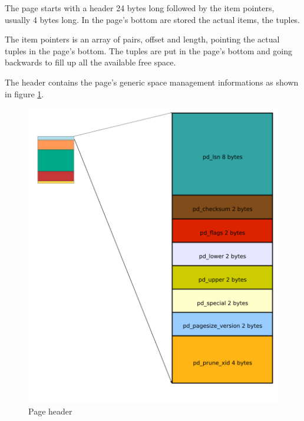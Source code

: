 The page starts with a header 24 bytes long followed 
by 
the item pointers, usually 4 bytes long. In the page's bottom are stored the 
actual items, the tuples.\newline

The item pointers is an array of pairs, offset and 
length, pointing the actual tuples in the page's bottom. The tuples are put in 
the page's bottom and going backwards to fill up all the available free 
space.\newline 

The header contains the page's generic space management informations as shown 
in figure \ref{fig:HEADERPAG01}. 


\begin{figure}[H]
\begin{center}

\includegraphics[scale=0.55]{images/header_page_01}

\caption{Page header}
\label{fig:HEADERPAG01} 
\end{center}

\end{figure}
